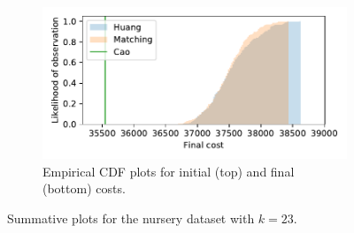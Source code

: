 \documentclass[smallextended]{svjour3}
\begin{document}
\begin{figure}
\begin{subfigure}{.5\textwidth}
        \includegraphics[width=\linewidth]{Fig3b2.pdf}
        \caption{Empirical CDF plots for initial (top) and final (bottom)
                 costs.}
    \end{subfigure}
    \caption{Summative plots for the nursery dataset with \(k=23\).}%
    \label{fig:nursery_knee}
\end{figure}
\end{document}

